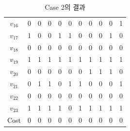 \documentclass{article}
\begin{document}
\begin{table}[htb!]
\begin{minipage}{0.475\linewidth}
\begin{tabular}{c | c c c c c c c c c c}
        $v_{16}$ & 0 & 0 & 0 & 0 & 0 & 0 & 0 & 0 & 0 & 1 \\
        $v_{17}$ & 1 & 0 & 0 & 1 & 1 & 0 & 0 & 0 & 1 & 0 \\
        $v_{18}$ & 0 & 0 & 0 & 0 & 0 & 0 & 0 & 0 & 0 & 0 \\
        $v_{19}$ & 1 & 1 & 1 & 1 & 1 & 1 & 1 & 1 & 1 & 1 \\
        $v_{20}$ & 0 & 0 & 0 & 0 & 0 & 0 & 1 & 1 & 1 & 0 \\
        $v_{21}$ & 0 & 1 & 1 & 0 & 1 & 1 & 0 & 0 & 0 & 1 \\
        $v_{22}$ & 0 & 0 & 0 & 0 & 0 & 0 & 0 & 0 & 0 & 0 \\
        $v_{23}$ & 1 & 1 & 1 & 1 & 0 & 1 & 1 & 1 & 1 & 1 \\
        \hline
        Cost & 0 & 0 & 0 & 0 & 0 & 0 & 0 & 0 & 0 & 0 \\
        \hline
    \end{tabular}
    \caption{Case 2의 결과}
    \label{tab:result2}
    \end{minipage}
    \end{table}
\end{document}
